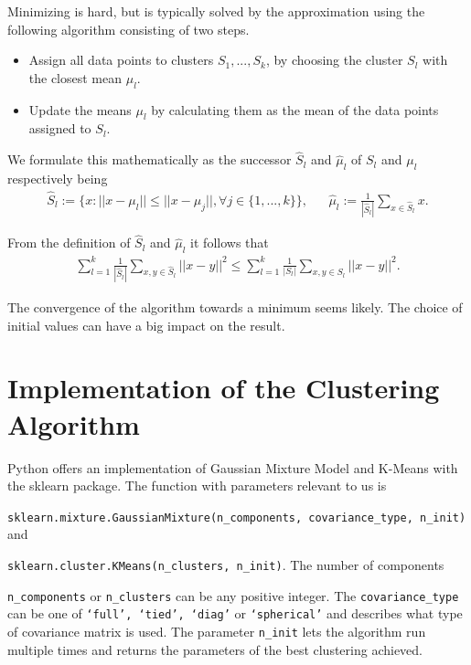 Minimizing is hard, but is typically solved by the approximation using the following algorithm consisting of two steps.

\begin{itemize}
	\item Assign all data points to clusters $S_1, ..., S_k$, by choosing the cluster $S_l$ with the closest mean $\mu_l$.
	\item Update the means $\mu_l$ by calculating them as the mean of the data points assigned to $S_l$.
\end{itemize}

We formulate this mathematically as the successor $\hat{S}_l$ and $\hat{\mu}_l$ of $S_l$ and $\mu_l$ respectively being
\begin{align*}
	\hat{S}_l := \{x: ||x-\mu_l|| \leq ||x-\mu_j||, \forall j \in \{1, ..., k\} \}, &&
	\hat{\mu}_l := \frac{1}{|\hat{S}_l|} \sum_{x \in \hat{S}_l} x.
\end{align*}

From the definition of $\hat{S}_l$ and $\hat{\mu}_l$ it follows that
\begin{align*}
	\sum_{l=1}^{k} \frac{1}{|\hat{S}_l|} \sum_{x, y \in \hat{S}_l} ||x-y||^2 \leq \sum_{l=1}^{k} \frac{1}{|S_l|} \sum_{x, y \in S_l} ||x-y||^2.
\end{align*}

The convergence of the algorithm towards a minimum seems likely. The choice of initial values can have a big impact on the result.

\section{Implementation of the Clustering Algorithm}

Python offers an implementation of Gaussian Mixture Model and K-Means with the sklearn package. The function with parameters relevant to us is

\noindent
\texttt{sklearn.mixture.GaussianMixture(n\_components, covariance\_type, n\_init)} and

\noindent
\texttt{sklearn.cluster.KMeans(n\_clusters, n\_init)}. The number of components

\noindent
\texttt{n\_components} or \texttt{n\_clusters} can be any positive integer. The \texttt{covariance\_type} can be one of \texttt{‘full’, ‘tied’, ‘diag’} or \texttt{‘spherical’} and describes what type of covariance matrix is used. The parameter \texttt{n\_init} lets the algorithm run multiple times and returns the parameters of the best clustering achieved.

